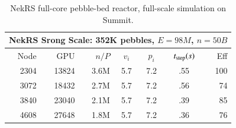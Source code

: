 \begin{table}
\footnotesize
\begin{center}
\begin{tabular}{|r|r|r|c|c|c|r|}
  \hline
  \multicolumn{7}{|c|}{{\bf NekRS Srong Scale: 352K pebbles}, $E=98M$, $n=50B$}\\
  \hline
  Node & GPU  & $n/P$ &  $v_i$ & $p_i$ & $t_{\rm step}(s)$ & Eff \\
  \hline
  2304   &  13824 &   3.6M   &   5.7&   7.2&    .55 &    100       \\%
  3072   &  18432 &   2.7M   &   5.7&   7.2&    .56 &    74        \\%
  3840   &  23040 &   2.1M   &   5.7&   7.2&    .39 &    85        \\%
  4608   &  27648 &   1.8M   &   5.7&   7.2&    .36 &    76        \\%
 \hline
 \end{tabular}
\end{center}
 \caption{\small\label{peb352k-strong} NekRS full-core pebble-bed reactor, full-scale simulation on Summit.}
\end{table}







